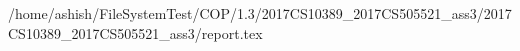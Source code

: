 /home/ashish/FileSystemTest/COP/1.3/2017CS10389_2017CS505521_ass3/2017CS10389_2017CS505521_ass3/report.tex